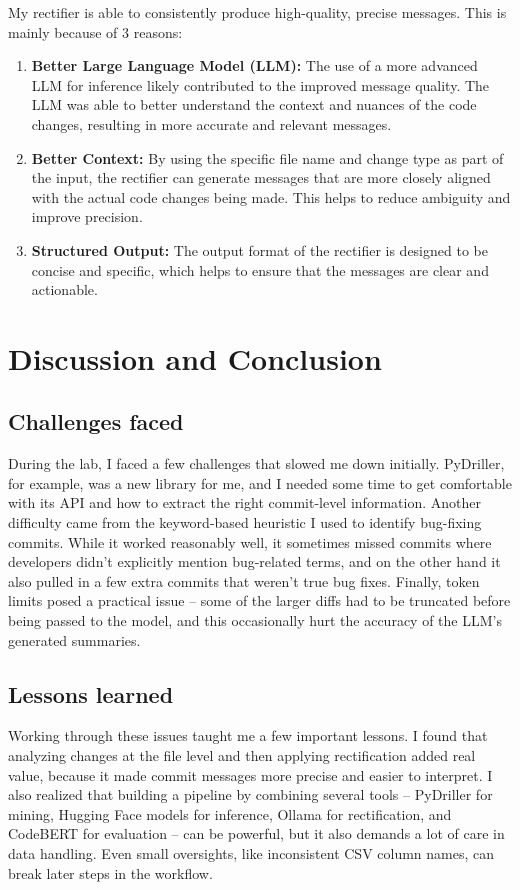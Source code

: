 \documentclass[10pt,a4paper]{report}
\begin{document}
My rectifier is able to consistently produce high-quality, precise messages. This is mainly because of 3 reasons:
\begin{enumerate}
    \item \textbf{Better Large Language Model (LLM):} The use of a more advanced LLM for inference likely contributed to the improved message quality. The LLM was able to better understand the context and nuances of the code changes, resulting in more accurate and relevant messages.
    \item \textbf{Better Context:} By using the specific file name and change type as part of the input, the rectifier can generate messages that are more closely aligned with the actual code changes being made. This helps to reduce ambiguity and improve precision.
    \item \textbf{Structured Output:} The output format of the rectifier is designed to be concise and specific, which helps to ensure that the messages are clear and actionable.
\end{enumerate}






\section{Discussion and Conclusion}

\subsection{Challenges faced}
During the lab, I faced a few challenges that slowed me down initially. PyDriller, for example, was a new library for me, and I needed some time to get comfortable with its API and how to extract the right commit-level information. Another difficulty came from the keyword-based heuristic I used to identify bug-fixing commits. While it worked reasonably well, it sometimes missed commits where developers didn’t explicitly mention bug-related terms, and on the other hand it also pulled in a few extra commits that weren’t true bug fixes. Finally, token limits posed a practical issue -- some of the larger diffs had to be truncated before being passed to the model, and this occasionally hurt the accuracy of the LLM’s generated summaries.

\subsection{Lessons learned}
Working through these issues taught me a few important lessons. I found that analyzing changes at the file level and then applying rectification added real value, because it made commit messages more precise and easier to interpret. I also realized that building a pipeline by combining several tools -- PyDriller for mining, Hugging Face models for inference, Ollama for rectification, and CodeBERT for evaluation -- can be powerful, but it also demands a lot of care in data handling. Even small oversights, like inconsistent CSV column names, can break later steps in the workflow.
\end{document}
